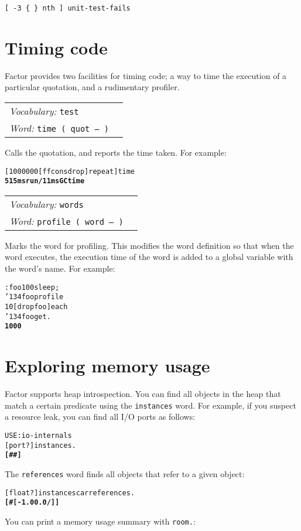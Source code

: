 \documentclass{book}
\newcommand{\bs}{\char'134}
\newcommand{\vocabulary}[1]{\emph{Vocabulary:} \texttt{#1}&\\}
\newcommand{\ordinaryword}[2]{\index{\texttt{#1}}\emph{Word:} \texttt{#2}&\\}
\newcommand{\wordtable}[1]{


\begin{tabularx}{12cm}{lX}
\hline
#1
\hline
\end{tabularx}

}
\begin{document}
\begin{verbatim}
[ -3 { } nth ] unit-test-fails
\end{verbatim}

\section{Timing code}

Factor provides two facilities for timing code; a way to time the execution of a particular quotation, and a rudimentary profiler.
\wordtable{
\vocabulary{test}
\ordinaryword{time}{time ( quot -- )}
}
Calls the quotation, and reports the time taken. For example:

\begin{alltt}
  [ 1000000 [ f f cons drop ] repeat ] time
\textbf{515 ms run / 11 ms GC time}
\end{alltt}

\wordtable{
\vocabulary{words}
\ordinaryword{profile}{profile ( word -- )}
}
Marks the word for profiling. This modifies the word definition so that when the word executes, the execution time of the word is added to a global variable with the word's name. For example:
\begin{alltt}
  : foo 100 sleep ;
  \bs foo profile
  10 [ drop foo ] each
  \bs foo get .
\textbf{1000}
\end{alltt}

\section{Exploring memory usage}\label{heap-reflection}

Factor supports heap introspection. You can find all objects in the heap that match a certain predicate using the \texttt{instances} word. For example, if you suspect a resource leak, you can find all I/O ports as follows:

\begin{alltt}
  USE: io-internals
  [ port? ] instances .
\textbf{[ \#<port @ 805466443> \#<port @ 805466499> ]}
\end{alltt}

The \texttt{references} word finds all objects that refer to a given object:

\begin{alltt}
  [ float? ] instances car references .
\textbf{[ \#<array @ 805542171> [ -1.0 0.0 / ] ]}
\end{alltt}

You can print a memory usage summary with \texttt{room.}:
\end{document}
